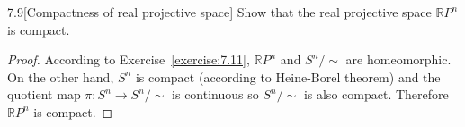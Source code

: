 \begin{problem}{7.9}[Compactness of real projective space]
Show that the real projective space \( \mathbb{R}P^{n} \) is compact.
\end{problem}

\begin{proof}
	According to Exercise~\ref{exercise:7.11}, \( \mathbb{R}P^{n} \) and \( S^{n}/\!\sim \) are homeomorphic. On the other hand, \( S^{n} \) is compact (according to Heine-Borel theorem) and the quotient map \( \pi: S^{n} \to S^{n}/\!\sim \) is continuous so \( S^{n}/\!\sim \) is also compact. Therefore \( \mathbb{R}P^{n} \) is compact.
\end{proof}
